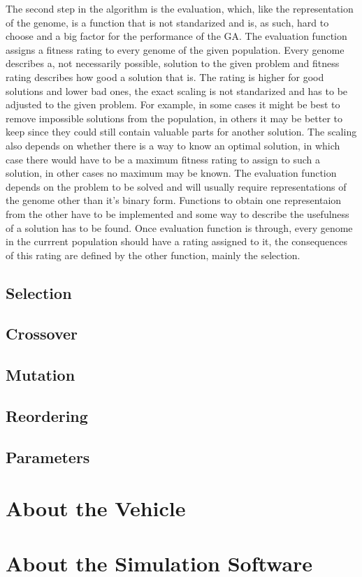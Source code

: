 The second step in the algorithm is the evaluation, which, like the representation of the genome, is a function that is not standarized and is, as such, hard to choose and a big factor for the performance of the GA. The evaluation function assigns a fitness rating to every genome of the given population. Every genome describes a, not necessarily possible, solution to the given problem and fitness rating describes how good a solution that is. The rating is higher for good solutions and lower bad ones, the exact scaling is not standarized and has to be adjusted to the given problem. For example, in some cases it might be best to remove impossible solutions from the population, in others it may be better to keep since they could still contain valuable parts for another solution. The scaling also depends on whether there is a way to know an optimal solution, in which case there would have to be a maximum fitness rating to assign to such a solution, in other cases no maximum may be known.
The evaluation function depends on the problem to be solved and will usually require representations of the genome other than it's binary form. Functions to obtain one representaion from the other have to be implemented and some way to describe the usefulness of a solution has to be found.
Once evaluation function is through, every genome in the currrent population should have a rating assigned to it, the consequences of this rating are defined by the other function, mainly the selection.

\subsection{Selection}
\label{sec:selection}



\subsection{Crossover}
\label{sec:crossover}



\subsection{Mutation}
\label{sec:mutation}



\subsection{Reordering}
\label{sec:reordering}



\subsection{Parameters}
\label{sec:parameters}



\section{About the Vehicle}
\label{sec:previous_knowledge_vehicle}



\section{About the Simulation Software}
\label{sec:previous_knowledge_ezsystems}
